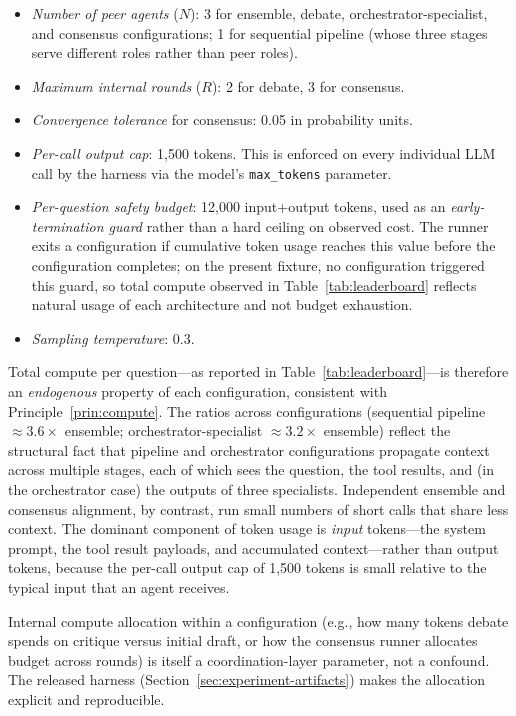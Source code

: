 \documentclass[11pt]{article}
\begin{document}
\begin{itemize}
\item \emph{Number of peer agents} ($N$): 3 for ensemble, debate, orchestrator-specialist, and consensus configurations; 1 for sequential pipeline (whose three stages serve different roles rather than peer roles).
\item \emph{Maximum internal rounds} ($R$): 2 for debate, 3 for consensus.
\item \emph{Convergence tolerance} for consensus: 0.05 in probability units.
\item \emph{Per-call output cap}: 1{,}500 tokens. This is enforced on every individual LLM call by the harness via the model's \texttt{max\_tokens} parameter.
\item \emph{Per-question safety budget}: 12{,}000 input+output tokens, used as an \emph{early-termination guard} rather than a hard ceiling on observed cost. The runner exits a configuration if cumulative token usage reaches this value before the configuration completes; on the present fixture, no configuration triggered this guard, so total compute observed in Table~\ref{tab:leaderboard} reflects natural usage of each architecture and not budget exhaustion.
\item \emph{Sampling temperature}: 0.3.
\end{itemize}

Total compute per question---as reported in Table~\ref{tab:leaderboard}---is therefore an \emph{endogenous} property of each configuration, consistent with Principle~\ref{prin:compute}. The ratios across configurations (sequential pipeline $\approx 3.6\times$ ensemble; orchestrator-specialist $\approx 3.2\times$ ensemble) reflect the structural fact that pipeline and orchestrator configurations propagate context across multiple stages, each of which sees the question, the tool results, and (in the orchestrator case) the outputs of three specialists. Independent ensemble and consensus alignment, by contrast, run small numbers of short calls that share less context. The dominant component of token usage is \emph{input} tokens---the system prompt, the tool result payloads, and accumulated context---rather than output tokens, because the per-call output cap of 1{,}500 tokens is small relative to the typical input that an agent receives.

Internal compute allocation within a configuration (e.g., how many tokens debate spends on critique versus initial draft, or how the consensus runner allocates budget across rounds) is itself a coordination-layer parameter, not a confound. The released harness (Section~\ref{sec:experiment-artifacts}) makes the allocation explicit and reproducible.
\end{document}
